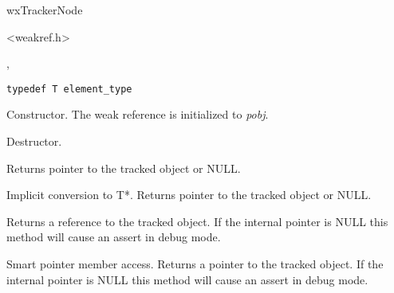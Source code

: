 
wxTrackerNode


<weakref.h>


, 


{\small%
\begin{verbatim}
typedef T element_type
\end{verbatim}
}%




\label{wxweakrefwxweakref}


Constructor. The weak reference is initialized to {\it pobj}.


\label{wxweakrefdtor}


Destructor.


\label{wxweakrefget}


Returns pointer to the tracked object or NULL.

\label{wxweakrefoperatorconvt}


Implicit conversion to T*. Returns pointer to the tracked
object or NULL.

\label{wxweakrefoperatorreft}


Returns a reference to the tracked object. If the internal pointer is NULL
this method will cause an assert in debug mode.


\label{wxweakrefoperatorderef}


Smart pointer member access. Returns a pointer to the
tracked object. If the internal pointer is NULL this
method will cause an assert in debug mode.


